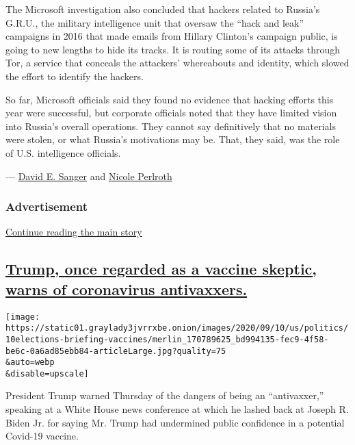 The Microsoft investigation also concluded that hackers related to
Russia's G.R.U., the military intelligence unit that oversaw the ``hack
and leak'' campaigns in 2016 that made emails from Hillary Clinton's
campaign public, is going to new lengths to hide its tracks. It is
routing some of its attacks through Tor, a service that conceals the
attackers' whereabouts and identity, which slowed the effort to identify
the hackers.

So far, Microsoft officials said they found no evidence that hacking
efforts this year were successful, but corporate officials noted that
they have limited vision into Russia's overall operations. They cannot
say definitively that no materials were stolen, or what Russia's
motivations may be. That, they said, was the role of U.S. intelligence
officials.

--- \href{https://www.nytimes3xbfgragh.onion/by/david-e-sanger}{David E.
Sanger} and
\href{https://www.nytimes3xbfgragh.onion/by/nicole-perlroth}{Nicole
Perlroth}

\hypertarget{advertisement-1}{%
\subsubsection{Advertisement}\label{advertisement-1}}

\protect\hyperlink{after-dfp-ad-mid2}{Continue reading the main story}

\hypertarget{trump-once-regarded-as-a-vaccine-skeptic-warns-of-coronavirus-antivaxxers}{%
\subsection{\texorpdfstring{\protect\hyperlink{trump-once-regarded-as-a-vaccine-skeptic-warns-of-coronavirus-antivaxxers}{Trump,
once regarded as a vaccine skeptic, warns of coronavirus
antivaxxers.}}{Trump, once regarded as a vaccine skeptic, warns of coronavirus antivaxxers.}}\label{trump-once-regarded-as-a-vaccine-skeptic-warns-of-coronavirus-antivaxxers}}

\texttt{[image: https://static01.graylady3jvrrxbe.onion/images/2020/09/10/us/politics/10elections-briefing-vaccines/merlin\_170789625\_bd994135-fec9-4f58-be6c-0a6ad85ebb84-articleLarge.jpg?quality=75\\\&auto=webp\\\&disable=upscale]}

President Trump warned Thursday of the dangers of being an
``antivaxxer,'' speaking at a White House news conference at which he
lashed back at Joseph R. Biden Jr. for saying Mr. Trump had undermined
public confidence in a potential Covid-19 vaccine.

